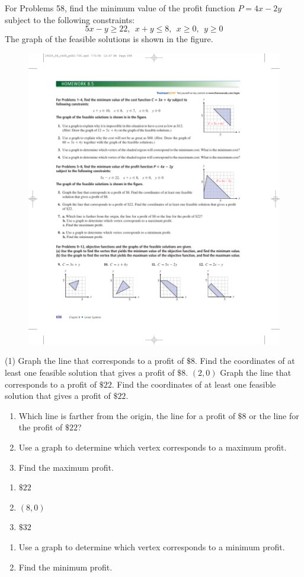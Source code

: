 \documentclass[10pt,]{book}
\theoremstyle{plain}
\theoremstyle{definition}
\theoremstyle{definition}
\theoremstyle{definition}
\numberwithin{equation}{part}
\begin{document}
\par\smallskip\noindent
\hypertarget{exercisegroup-2}{}\par\noindent For Problems 5\textendash{}8, find the minimum value of the profit function \(P = 4x - 2y\) subject to the following constraints:%
\begin{equation*}
5x- y \ge 22, ~~x + y\le 8, ~~x \ge 0, ~~y \ge 0
\end{equation*}
The graph of the feasible solutions is shown in the figure. \leavevmode%
\begin{figure}
\centering
\includegraphics[width=0.35\linewidth]{images/fig-8-5-5}
\end{figure}
%
\begin{exercisegroup}(1)
\exercise[5.]\hypertarget{exercise-9}{}Graph the line that corresponds to a profit of \(\$8\). Find the coordinates of at least one feasible solution that gives a profit of \(\$8\).%
\((2,0) \)%
\exercise[6.]\hypertarget{exercise-10}{}Graph the line that corresponds to a profit of \(\$22\). Find the coordinates of at least one feasible solution that gives a profit of \(\$22\).%
\exercise[7.]\hypertarget{exercise-11}{}\leavevmode%
\begin{enumerate}[label=(\alph*)]
\item\hypertarget{li-52}{}Which line is farther from the origin, the line for a profit of \(\$8\) or the line for the profit of \(\$22\)?%
\item\hypertarget{li-53}{}Use a graph to determine which vertex corresponds to a maximum profit.%
\item\hypertarget{li-54}{}Find the maximum profit.%
\end{enumerate}
%
\leavevmode%
\begin{multicols}{3}
\begin{enumerate}[label=(\alph*)]
\item\hypertarget{li-55}{}\(\$22\)%
\item\hypertarget{li-56}{}\((8, 0)\)%
\item\hypertarget{li-57}{}\(\$32\)%
\end{enumerate}
\end{multicols}
%
\exercise[8.]\hypertarget{exercise-12}{}\leavevmode%
\begin{enumerate}[label=(\alph*)]
\item\hypertarget{li-58}{}Use a graph to determine which vertex corresponds to a minimum profit.%
\item\hypertarget{li-59}{}Find the minimum profit.%
\end{enumerate}
%
\end{exercisegroup}
\end{document}

